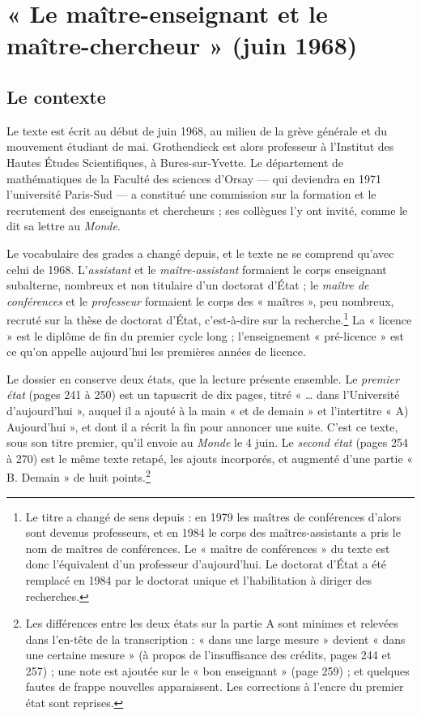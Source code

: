 \documentclass[11pt,a4paper]{article}
\begin{document}
\section*{« Le maître-enseignant et le maître-chercheur » (juin 1968)}

\subsection*{Le contexte}

Le texte est écrit au début de juin 1968, au milieu de la grève générale et
du mouvement étudiant de mai. Grothendieck est alors professeur à l'Institut
des Hautes Études Scientifiques, à Bures-sur-Yvette. Le département de
mathématiques de la Faculté des sciences d'Orsay — qui deviendra en 1971
l'université Paris-Sud — a constitué une commission sur la formation et le
recrutement des enseignants et chercheurs ; ses collègues l'y ont invité,
comme le dit sa lettre au \emph{Monde}.

Le vocabulaire des grades a changé depuis, et le texte ne se comprend qu'avec
celui de 1968. L'\emph{assistant} et le \emph{maître-assistant} formaient le
corps enseignant subalterne, nombreux et non titulaire d'un doctorat
d'État ; le \emph{maître de conférences} et le \emph{professeur} formaient le
corps des « maîtres », peu nombreux, recruté sur la thèse de doctorat d'État,
c'est-à-dire sur la recherche.\footnote{Le titre a changé de sens depuis : en
1979 les maîtres de conférences d'alors sont devenus professeurs, et en 1984
le corps des maîtres-assistants a pris le nom de maîtres de conférences. Le
« maître de conférences » du texte est donc l'équivalent d'un professeur
d'aujourd'hui. Le doctorat d'État a été remplacé en 1984 par le doctorat
unique et l'habilitation à diriger des recherches.} La « licence » est le
diplôme de fin du premier cycle long ; l'enseignement « pré-licence » est
ce qu'on appelle aujourd'hui les premières années de licence.

Le dossier en conserve deux états, que la lecture présente ensemble. Le
\emph{premier état} (pages 241 à 250) est un tapuscrit de dix pages, titré
« \ldots{} dans l'Université d'aujourd'hui », auquel il a ajouté à la main
« et de demain » et l'intertitre « A) Aujourd'hui », et dont il a récrit la
fin pour annoncer une suite. C'est ce texte, sous son titre premier, qu'il
envoie au \emph{Monde} le 4 juin. Le \emph{second état} (pages 254 à 270)
est le même texte retapé, les ajouts incorporés, et augmenté d'une partie
« B. Demain » de huit points.\footnote{Les différences entre les deux états
sur la partie A sont minimes et relevées dans l'en-tête de la transcription :
« dans une large mesure » devient « dans une certaine mesure » (à propos de
l'insuffisance des crédits, pages 244 et 257) ; une note est ajoutée sur le
« bon enseignant » (page 259) ; et quelques fautes de frappe nouvelles
apparaissent. Les corrections à l'encre du premier état sont reprises.}
\end{document}
